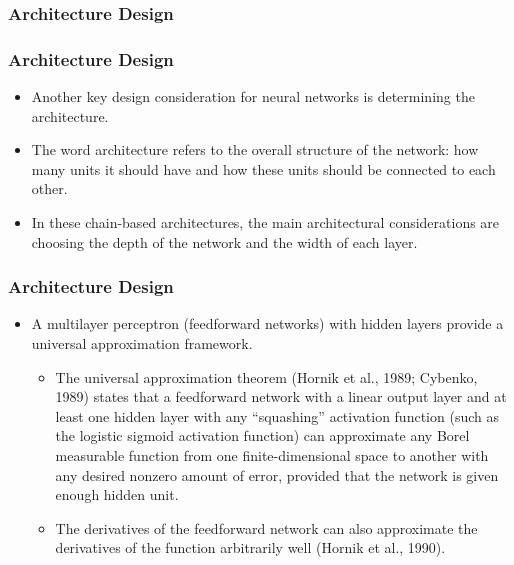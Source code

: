 \documentclass[
  shownotes,
  xcolor={svgnames},
  hyperref={colorlinks,citecolor=DarkBlue,linkcolor=DarkRed,urlcolor=DarkBlue}
  , aspectratio=169]{beamer}
\begin{document}
\subsubsection{Architecture Design}
\begin{frame}
\frametitle{Architecture Design}

\begin{itemize}


\item Another key design consideration for neural networks is determining the architecture.
\medskip
\item The word architecture refers to the overall structure of the network: how many units it should have and how these units should be connected to each other.
\medskip
\item In these chain-based architectures, the main architectural considerations are choosing the depth of the network and the width of each layer. 


\end{itemize}

\end{frame}
\begin{frame}
\frametitle{Architecture Design}

\begin{itemize}

\item A multilayer perceptron (feedforward networks) with hidden layers provide a universal approximation framework. 
\medskip
\begin{itemize}
\item The universal approximation theorem (Hornik et al., 1989; Cybenko, 1989) states that a feedforward network with a linear output layer and at least one hidden layer with any “squashing” activation function (such as the logistic sigmoid activation function) can approximate any Borel measurable function from one ﬁnite-dimensional space to another with any desired nonzero amount of error, provided that the network is given enough hidden unit.
\medskip
\item The derivatives of the feedforward network can also approximate the derivatives of the function arbitrarily well (Hornik et al., 1990). 
\end{itemize}



\end{itemize}

\end{frame}
\end{document}
